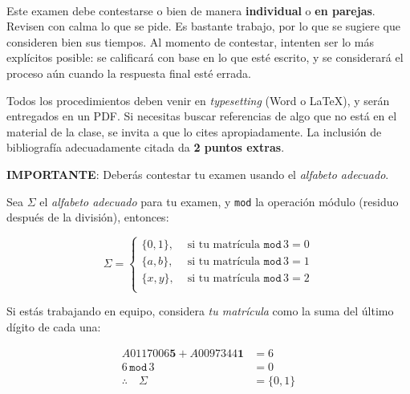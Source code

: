 \documentclass[8pt, onside]{article}
\title{
    \myclass \\
    \textbf{\mytitle} \\
    \myheader
    \date{}
}
\begin{document}
\maketitle

\vspace{-1.5cm}

Este examen debe contestarse o bien de manera \textbf{individual} o \textbf{en parejas}.
Revisen con calma lo que se pide. Es bastante trabajo, por lo que se sugiere que consideren bien sus tiempos.
Al momento de contestar, intenten ser lo más explícitos posible: se calificará con base en lo que esté escrito, y se considerará el proceso aún cuando la respuesta final esté errada.

\vspace{1.5ex}

Todos los procedimientos deben venir en \textit{typesetting} (Word o \LaTeX), y serán entregados en un PDF.
Si necesitas buscar referencias de algo que no está en el material de la clase, se invita a que lo cites apropiadamente.
La inclusión de bibliografía adecuadamente citada da \textbf{2 puntos extras}.

\vspace{1.5ex}

\textbf{IMPORTANTE}: Deberás contestar tu examen usando el \textit{alfabeto adecuado}.

\vspace{1.5ex}

Sea $\Sigma$ el \textit{alfabeto adecuado} para tu examen, y \texttt{mod} la operación módulo (residuo después de la división), entonces:

$$ \Sigma = 
\begin{cases}
   \{0,1\}, & \text{ si tu matrícula } \mathtt{mod} \, 3 = 0 \\
   \{a,b\}, & \text{ si tu matrícula } \mathtt{mod} \, 3 = 1 \\
   \{x,y\}, & \text{ si tu matrícula } \mathtt{mod} \, 3 = 2 \\
\end{cases}
$$

Si estás trabajando en equipo, considera \textit{tu matrícula} como la suma del último dígito de cada una:

\begin{align*}
    A0117006\mathbf{5} + A0097344\mathbf{1} & =  6 \\
    6 \, \mathtt{mod} \, 3 & = 0\\
    \therefore \quad \Sigma & = \{0,1\}
\end{align*}
\end{document}
